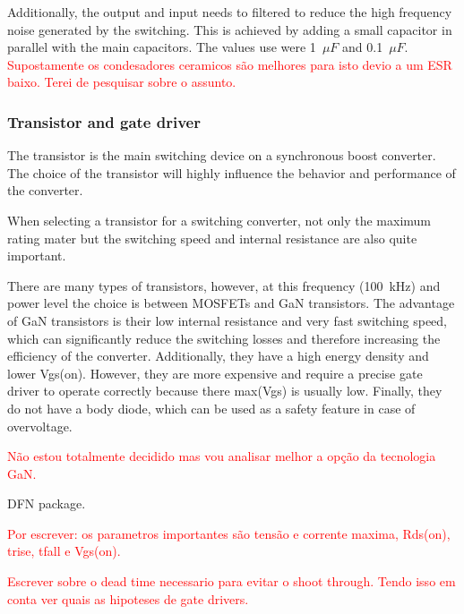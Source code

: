     Additionally, the output and input needs to filtered to reduce the high frequency noise generated by the switching. This is achieved by adding a small capacitor in parallel with the main capacitors. The values use were 1~$\mu F$ and 0.1~$\mu F$. \textcolor{red}{Supostamente os condesadores ceramicos são melhores para isto devio a um ESR baixo. Terei de pesquisar sobre o assunto.}

\subsubsection{Transistor and gate driver}
    The transistor is the main switching device on a synchronous boost converter. The choice of the transistor will highly influence the behavior and performance of the converter.

    When selecting a transistor for a switching converter, not only the maximum rating mater but the switching speed and internal resistance are also quite important. 
    
    There are many types of transistors, however, at this frequency (100~kHz) and power level the choice is between MOSFETs and GaN transistors. The advantage of GaN transistors is their low internal resistance and very fast switching speed, which can significantly reduce the switching losses and therefore increasing the efficiency of the converter. Additionally, they have a high energy density and lower Vgs(on). However, they are more expensive and require a precise gate driver to operate correctly because there max(Vgs) is usually low. Finally, they do not have a body diode, which can be used as a safety feature in case of overvoltage.

    \textcolor{red}{Não estou totalmente decidido mas vou analisar melhor a opção da tecnologia GaN.}

    DFN package.

    \textcolor{red}{Por escrever: os parametros importantes são tensão e corrente maxima, Rds(on), trise, tfall e Vgs(on). }

    \textcolor{red}{Escrever sobre o dead time necessario para evitar o shoot through. Tendo isso em conta ver quais as hipoteses de gate drivers.}

